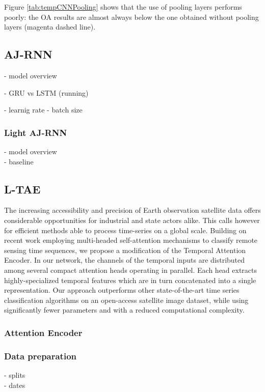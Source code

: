 Figure \ref{tab:tempCNNPooling} shows that the use of pooling layers performs poorly: the OA results are almost always
below the one obtained without pooling layers (magenta dashed line). 





\pagebreak
\subsection{AJ-RNN}
- model overview

- GRU vs LSTM (running)

- learnig rate
- batch size 

\subsubsection{Light AJ-RNN}
- model overview\\
- baseline
\pagebreak
\subsection{L-TAE}
The increasing accessibility and precision of Earth observation satellite data offers considerable opportunities for industrial and state actors alike. This calls however for efficient methods able to process time-series on a global scale. Building on recent work employing multi-headed self-attention mechanisms to classify remote sensing time sequences, we propose a modification of the Temporal Attention Encoder. In our network, the channels of the temporal inputs are distributed among several compact attention heads operating in parallel. Each head extracts highly-specialized temporal features which are in turn concatenated into a single representation. Our approach outperforms other state-of-the-art time series classification algorithms on an open-access satellite image dataset, while using significantly fewer parameters and with a reduced computational complexity.

\subsubsection{Attention Encoder}

\subsubsection{Data preparation}
- splits\\
- dates\\

